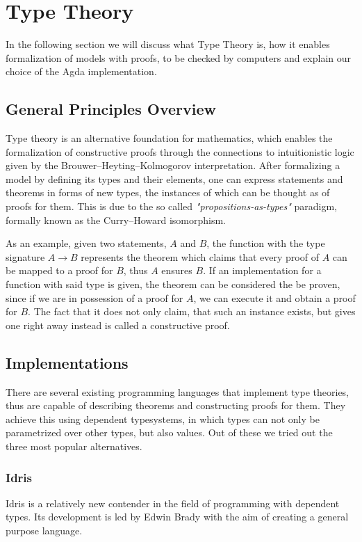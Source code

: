 \section{Type Theory}
In the following section we will discuss what Type Theory is, how it enables formalization of models with proofs, to be checked by computers and explain our choice of the Agda implementation.

\subsection{General Principles Overview}

Type theory is an alternative foundation for mathematics, which enables the formalization of constructive proofs through the connections to intuitionistic logic given by the Brouwer–Heyting–Kolmogorov interpretation. After formalizing a model by defining its types and their elements, one can express statements and theorems in forms of new types, the instances of which can be thought as of proofs for them.
This is due to the so called \textit{"propositions-as-types"} paradigm, formally known as the Curry–Howard isomorphism.

As an example, given two statements, $A$ and $B$, the function with the type signature $A \to B$ represents the theorem which claims that every proof of $A$ can be mapped to a proof for $B$, thus $A$ ensures $B$. If an implementation for a function with said type is given, the theorem can be considered the be proven, since if we are in possession of a proof for $A$, we can execute it and obtain a proof for $B$. The fact that it does not only claim, that such an instance exists, but gives one right away instead is called a constructive proof.

\subsection{Implementations}
There are several existing programming languages that implement type theories, thus are capable of describing theorems and constructing proofs for them. They achieve this using dependent typesystems, in which types can not only be parametrized over other types, but also values. Out of these we tried out the three most popular alternatives.

\subsubsection{Idris}
Idris\cite{Brady2013IdrisAG} is a relatively new contender in the field of programming with dependent types. Its development is led by Edwin Brady with the aim of creating a general purpose language.

